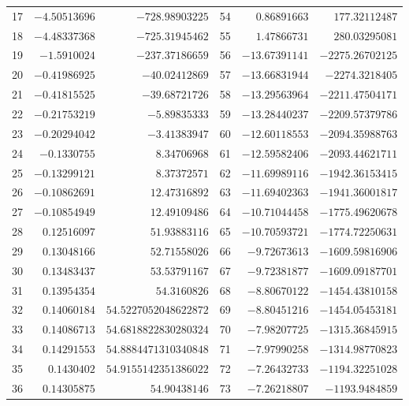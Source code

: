 \begin{table}[p]
\begin{tabular}{rrr@{\quad}rrr}
17 & $-4.50513696$ & $-728.98903225$ & 54 & $0.86891663$ & $177.32112487$ \\
18 & $-4.48337368$ & $-725.31945462$ & 55 & $1.47866731$ & $280.03295081$ \\
19 & $-1.5910024$ & $-237.37186659$ & 56 & $-13.67391141$ & $-2275.26702125$ \\
20 & $-0.41986925$ & $-40.02412869$ & 57 & $-13.66831944$ & $-2274.3218405$ \\
21 & $-0.41815525$ & $-39.68721726$ & 58 & $-13.29563964$ & $-2211.47504171$ \\
22 & $-0.21753219$ & $-5.89835333$ & 59 & $-13.28440237$ & $-2209.57379786$ \\
23 & $-0.20294042$ & $-3.41383947$ & 60 & $-12.60118553$ & $-2094.35988763$ \\
24 & $-0.1330755$ & $8.34706968$ & 61 & $-12.59582406$ & $-2093.44621711$ \\
25 & $-0.13299121$ & $8.37372571$ & 62 & $-11.69989116$ & $-1942.36153415$ \\
26 & $-0.10862691$ & $12.47316892$ & 63 & $-11.69402363$ & $-1941.36001817$ \\
27 & $-0.10854949$ & $12.49109486$ & 64 & $-10.71044458$ & $-1775.49620678$ \\
28 & $0.12516097$ & $51.93883116$ & 65 & $-10.70593721$ & $-1774.72250631$ \\
29 & $0.13048166$ & $52.71558026$ & 66 & $-9.72673613$ & $-1609.59816906$ \\
30 & $0.13483437$ & $53.53791167$ & 67 & $-9.72381877$ & $-1609.09187701$ \\
31 & $0.13954354$ & $54.3160826$ & 68 & $-8.80670122$ & $-1454.43810158$ \\
32 & $0.14060184$ & $54.5227052048622872$ & 69 & $-8.80451216$ & $-1454.05453181$ \\
33 & $0.14086713$ & $54.6818822830280324$ & 70 & $-7.98207725$ & $-1315.36845915$ \\
34 & $0.14291553$ & $54.8884471310340848$ & 71 & $-7.97990258$ & $-1314.98770823$ \\
35 & $0.1430402$ & $54.9155142351386022$ & 72 & $-7.26432733$ & $-1194.32251028$ \\
36 & $0.14305875$ & $54.90438146$ & 73 & $-7.26218807$ & $-1193.9484859$ \\
\bottomrule
\end{tabular}
\end{table}

